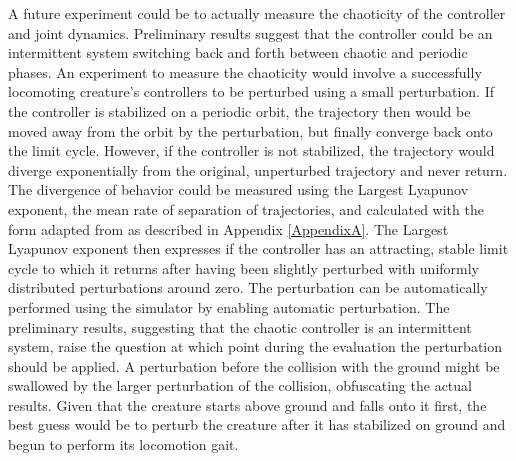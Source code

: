 \documentclass[main]{subfiles}
\begin{document}
A future experiment could be to actually measure the chaoticity of the controller and joint dynamics. %
%
Preliminary results suggest that the controller could be an intermittent system switching back and forth between chaotic and periodic phases. %
%
An experiment to measure the chaoticity would involve a successfully locomoting creature's controllers to be perturbed using a small perturbation. %
%
If the controller is stabilized on a periodic orbit, the trajectory then would be moved away from the orbit by the perturbation, but finally converge back onto the limit cycle. %
%
However, if the controller is not stabilized, the trajectory would diverge exponentially from the original, unperturbed trajectory and never return. %
%
The divergence of behavior could be measured using the Largest Lyapunov exponent, the mean rate of separation of trajectories, and calculated with the form adapted from \cite{bib:Rosenstein1993} as described in Appendix \ref{AppendixA}. %
%
The Largest Lyapunov exponent then expresses if the controller has an attracting, stable limit cycle to which it returns after having been slightly perturbed with uniformly distributed perturbations around zero. %
%
The perturbation can be automatically performed using the simulator by enabling automatic perturbation. %
%
The preliminary results, suggesting that the chaotic controller is an intermittent system, raise the question at which point during the evaluation the perturbation should be applied. %
%
A perturbation before the collision with the ground might be swallowed by the larger perturbation of the collision, obfuscating the actual results. %
%
Given that the creature starts above ground and falls onto it first, the best guess would be to perturb the creature after it has stabilized on ground and begun to perform its locomotion gait. 
\end{document}
